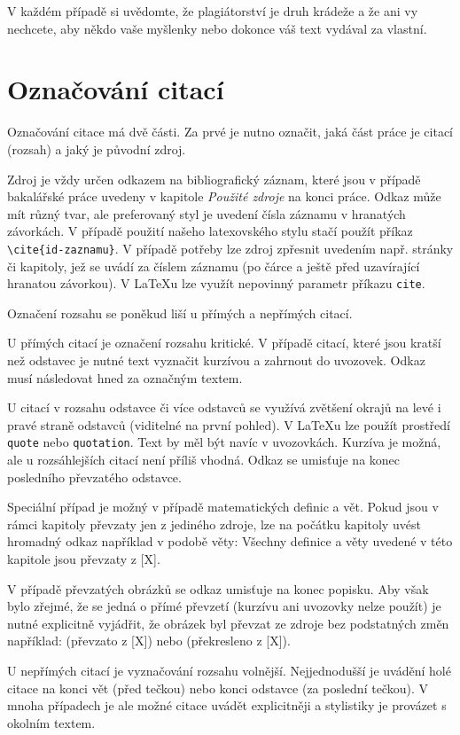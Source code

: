 \documentclass[male,czech,api_bc]{kitheses}
\begin{document}
V každém případě si uvědomte, že plagiátorství je druh krádeže a že ani vy nechcete, aby někdo vaše myšlenky nebo dokonce váš text vydával za vlastní.

\section{Označování citací}

Označování citace má dvě části. Za prvé je nutno označit, jaká část práce je citací (rozsah) a jaký je původní zdroj. 

Zdroj je vždy určen odkazem na bibliografický záznam, které jsou v případě bakalářské práce uvedeny v kapitole \textit{Použité zdroje} na konci práce. Odkaz může mít různý tvar, ale preferovaný styl je uvedení čísla záznamu v hranatých závorkách. V případě použití našeho latexovského stylu stačí použít příkaz \verb!\cite{id-zaznamu}!. V případě potřeby lze zdroj zpřesnit uvedením např. stránky či kapitoly, jež se uvádí za číslem záznamu (po čárce a ještě před uzavírající hranatou závorkou). V \LaTeX u lze využít nepovinný parametr příkazu \verb!cite!.

Označení rozsahu se poněkud liší u přímých a nepřímých citací.

U přímých citací je označení rozsahu kritické. V případě citací, které jsou kratší než odstavec je nutné text vyznačit kurzívou a zahrnout do uvozovek. Odkaz musí následovat hned za označným textem.

U citací v rozsahu odstavce či více odstavců se využívá zvětšení okrajů na levé i pravé straně odstavců (viditelné na první pohled). V \LaTeX u lze použít prostředí \verb!quote! nebo \verb!quotation!. Text by měl být navíc v uvozovkách. Kurzíva je možná, ale u rozsáhlejších citací není příliš vhodná. Odkaz se umisťuje na konec posledního převzatého odstavce.

Speciální případ je možný v případě matematických definic a vět. Pokud jsou v rámci kapitoly převzaty jen z jediného zdroje, lze na počátku kapitoly uvést hromadný odkaz například v podobě věty: Všechny definice a věty uvedené v této kapitole jsou převzaty z [X].

V případě převzatých obrázků se odkaz umisťuje na konec popisku. Aby však bylo zřejmé, že se jedná o přímé převzetí (kurzívu ani uvozovky nelze použít) je nutné explicitně vyjádřit, že obrázek byl převzat ze zdroje bez podstatných změn například: (převzato z [X]) nebo (překresleno z [X]).

U nepřímých citací je vyznačování rozsahu volnější. Nejjednodušší je uvádění holé citace na konci vět (před tečkou) nebo konci odstavce (za poslední tečkou). V mnoha případech je ale možné citace
uvádět explicitněji a stylistiky je provázet s okolním textem.
\end{document}
